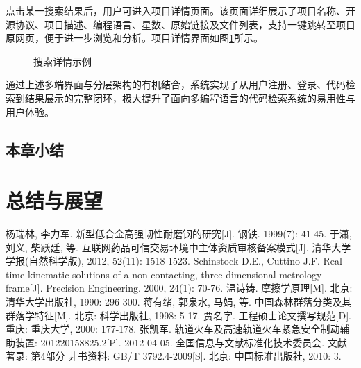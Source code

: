 \documentclass[UTF8,a4paper,12pt]{ctexart}
\numberwithin{equation}{section}
\begin{document}
点击某一搜索结果后，用户可进入项目详情页面。该页面详细展示了项目名称、开源协议、项目描述、编程语言、星数、原始链接及文件列表，支持一键跳转至项目原网页，便于进一步浏览和分析。项目详情界面如图\ref{repodetailpage}所示。
\begin{figure}[H]
	\caption{搜索详情示例}
	\label{repodetailpage}
\end{figure}
通过上述多端界面与分层架构的有机结合，系统实现了从用户注册、登录、代码检索到结果展示的完整闭环，极大提升了面向多编程语言的代码检索系统的易用性与用户体验。
\subsection{本章小结}

\section{总结与展望}

\newpage
{}

\renewcommand\refname{参考文献}


\begin{thebibliography}{1}
\setlength{\itemsep}{0pt}
 杨瑞林, 李力军. 新型低合金高强韧性耐磨钢的研究[J]. 钢铁. 1999(7): 41-45.
 于潇, 刘义, 柴跃廷, 等. 互联网药品可信交易环境中主体资质审核备案模式[J]. 清华大学学报(自然科学版), 2012, 52(11): 1518-1523.
 Schinstock D.E., Cuttino J.F. Real time kinematic solutions of a non-contacting, three dimensional metrology frame[J]. Precision Engineering. 2000, 24(1): 70-76. 
 温诗铸. 摩擦学原理[M]. 北京: 清华大学出版社, 1990: 296-300.
 蒋有绪, 郭泉水, 马娟, 等. 中国森林群落分类及其群落学特征[M]. 北京: 科学出版社, 1998: 5-17.
 贾名字. 工程硕士论文撰写规范[D]. 重庆: 重庆大学, 2000: 177-178.
 张凯军. 轨道火车及高速轨道火车紧急安全制动辅助装置: 201220158825.2[P]. 2012-04-05.
 全国信息与文献标准化技术委员会. 文献著录: 第4部分 非书资料: GB/T 3792.4-2009[S]. 北京: 中国标准出版社, 2010: 3.
\end{thebibliography}
\end{document}
